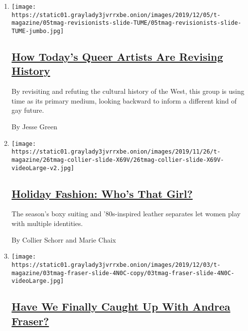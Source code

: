 \begin{enumerate}
\def\labelenumi{\arabic{enumi}.}
\item
  \texttt{[image: https://static01.graylady3jvrrxbe.onion/images/2019/12/05/t-magazine/05tmag-revisionists-slide-TUME/05tmag-revisionists-slide-TUME-jumbo.jpg]}

  \hypertarget{how-todays-queer-artists-are-revising-history}{%
  \subsection{\texorpdfstring{\href{/2019/12/04/t-magazine/gay-artwork-history.html}{How
  Today's Queer Artists Are Revising
  History}}{How Today's Queer Artists Are Revising History}}\label{how-todays-queer-artists-are-revising-history}}

  By revisiting and refuting the cultural history of the West, this
  group is using time as its primary medium, looking backward to inform
  a different kind of gay future.

  By Jesse Green
\item
  \texttt{[image: https://static01.graylady3jvrrxbe.onion/images/2019/11/26/t-magazine/26tmag-collier-slide-X69V/26tmag-collier-slide-X69V-videoLarge-v2.jpg]}

  \hypertarget{holiday-fashion-whos-that-girl}{%
  \subsection{\texorpdfstring{\href{/2019/11/26/t-magazine/holiday-fashion.html}{Holiday
  Fashion: Who's That
  Girl?}}{Holiday Fashion: Who's That Girl?}}\label{holiday-fashion-whos-that-girl}}

  The season's boxy suiting and '80s-inspired leather separates let
  women play with multiple identities.

  By Collier Schorr and Marie Chaix
\item
  \texttt{[image: https://static01.graylady3jvrrxbe.onion/images/2019/12/03/t-magazine/03tmag-fraser-slide-4N0C-copy/03tmag-fraser-slide-4N0C-videoLarge.jpg]}

  \hypertarget{have-we-finally-caught-up-with-andrea-fraser}{%
  \subsection{\texorpdfstring{\href{/2019/12/03/t-magazine/andrea-fraser.html}{Have
  We Finally Caught Up With Andrea
  Fraser?}}{Have We Finally Caught Up With Andrea Fraser?}}\label{have-we-finally-caught-up-with-andrea-fraser}}


\end{enumerate}
